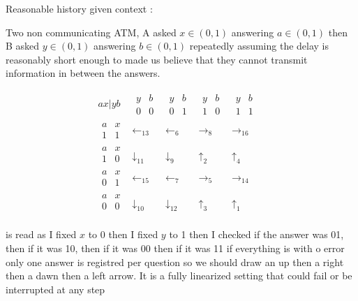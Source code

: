 \documentclass{article}
\begin{document}
Reasonable history given context :

Two non communicating ATM,  A asked $x\in (0,1)$  answering $a\in (0,1)$ then B  asked $y\in (0,1)$ answering $b\in (0,1)$ repeatedly assuming the delay is reasonably short enough to made us believe that  they cannot transmit information in between the answers.

$$
\begin{matrix}
ax|yb&\begin{matrix} y&b\\ 0&0\end{matrix}&\begin{matrix} y&b\\ 0&1\end{matrix}&\begin{matrix} y&b\\ 1&0\end{matrix}&\begin{matrix} y&b\\ 1&1\end{matrix}&\\
\begin{matrix} a& x\\1 &1\end{matrix}& \leftarrow_{13} &\leftarrow_{6} & \rightarrow_{8} &\rightarrow_{16}\\
\begin{matrix} a& x\\1 &0\end{matrix}& \downarrow_{11} &\downarrow_{9} & \uparrow_{2} &\uparrow_{4}\\
\begin{matrix} a& x\\0 &1\end{matrix}& \leftarrow_{15} &\leftarrow_{7} & \rightarrow_{5} &\rightarrow_{14}\\
\begin{matrix} a& x\\0 &0\end{matrix}& \downarrow_{10} &\downarrow_{12} & \uparrow_{3} &\uparrow_{1}\\
\end{matrix}
$$

is read as I fixed $x$ to 0  then I fixed $y$ to 1 then I checked if  the answer was 01, then if it was 10, then if it was 00 then if it was 11
if everything is  with o error only one answer is registred per question so we should draw an up then a right then  a dawn then a left arrow.
It is a fully linearized setting that could fail or be interrupted at any step
\end{document}
